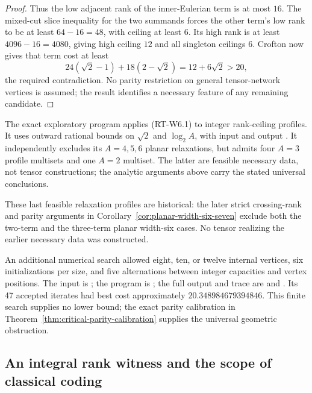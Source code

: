 \begin{proof}
Thus the low adjacent rank of the inner-Eulerian term
is at most $16$. The mixed-cut slice inequality for
the two summands forces the other term's low rank to
be at least $64-16=48$, with ceiling at least $6$.
Its high rank is at least $4096-16=4080$, giving high
ceiling $12$ and all singleton ceilings $6$. Crofton
now gives that term cost at least
\[
 24(\sqrt2-1)+18(2-\sqrt2)=12+6\sqrt2>20,
\]
the required contradiction. No parity restriction on
general tensor-network vertices is assumed; the result
identifies a necessary feature of any remaining candidate.
\end{proof}

The exact exploratory program
 applies (RT-W6.1)
to integer rank-ceiling profiles. It uses outward rational
bounds on $\sqrt2$ and $\log_2A$, with input
 and output
. It independently
excludes its $A=4,5,6$ planar relaxations, but admits four
$A=3$ profile multisets and one $A=2$ multiset. The latter
are feasible necessary data, not tensor constructions; the
analytic arguments above carry the stated universal conclusions.

These last feasible relaxation profiles are historical: the later
strict crossing-rank and parity arguments in
Corollary~\ref{cor:planar-width-six-seven} exclude both the two-term
and the three-term planar width-six cases. No tensor realizing
the earlier necessary data was constructed.

An additional numerical search allowed eight, ten, or twelve
internal vertices, six initializations per size, and five
alternations between integer capacities and vertex positions.
The input is ; the
program is ; the full
output and trace are 
and .
Its 47 accepted iterates had best cost approximately
$20.348984679394846$. This finite search supplies no lower bound;
the exact parity calibration in
Theorem~\ref{thm:critical-parity-calibration} supplies the
universal geometric obstruction.



\subsection{An integral rank witness and the scope of classical coding}

